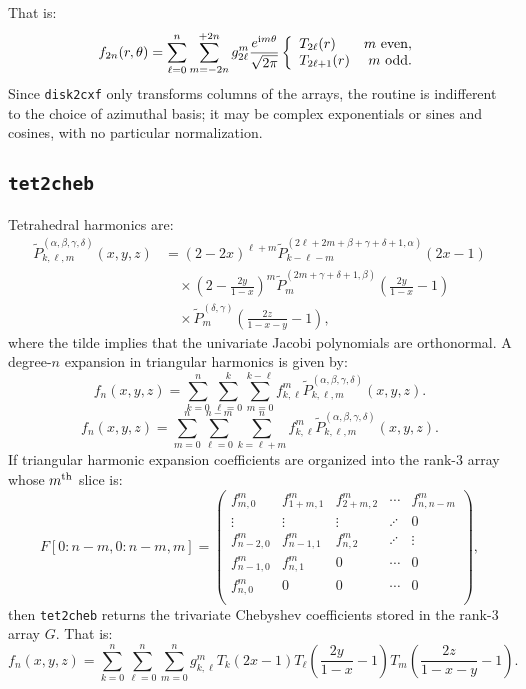 \documentclass{article}
\def\ii{{\rm i}}
\begin{document}
That is:
\begin{equation}
f_{2n}(r,\theta) = \sum_{\ell=0}^{n}\sum_{m=-2n}^{+2n} g_{2\ell}^m \frac{e^{\ii m\theta}}{\sqrt{2\pi}} \left\{\begin{array}{lr} T_{2\ell}(r) & m~{\rm even},\\ T_{2\ell+1}(r) & m~{\rm odd}.\end{array}\right.
\end{equation}
Since {\tt disk2cxf} only transforms columns of the arrays, the routine is indifferent to the choice of azimuthal basis; it may be complex exponentials or sines and cosines, with no particular normalization.

\subsection{{\tt tet2cheb}}

Tetrahedral harmonics are:
\begin{align}
\tilde{P}_{k,\ell,m}^{(\alpha,\beta,\gamma,\delta)}(x,y,z) & = (2-2x)^{\ell+m} \tilde{P}_{k-\ell-m}^{(2\ell+2m+\beta+\gamma+\delta+1,\alpha)}(2x-1)\nonumber\\
& \quad \times \left(2-\frac{2y}{1-x}\right)^m \tilde{P}_m^{(2m+\gamma+\delta+1,\beta)}\left(\frac{2y}{1-x}-1\right)\\
& \quad \times \tilde{P}_m^{(\delta,\gamma)}\left(\frac{2z}{1-x-y}-1\right),\nonumber
\end{align}
where the tilde implies that the univariate Jacobi polynomials are orthonormal. A degree-$n$ expansion in triangular harmonics is given by:
\begin{equation}
f_n(x,y,z) = \sum_{k=0}^n\sum_{\ell=0}^k\sum_{m=0}^{k-\ell} f_{k,\ell}^m \tilde{P}_{k,\ell,m}^{(\alpha,\beta,\gamma,\delta)}(x,y,z).
\end{equation}
\begin{equation}
f_n(x,y,z) = \sum_{m=0}^n\sum_{\ell=0}^{n-m}\sum_{k=\ell+m}^n f_{k,\ell}^m \tilde{P}_{k,\ell,m}^{(\alpha,\beta,\gamma,\delta)}(x,y,z).
\end{equation}
If triangular harmonic expansion coefficients are organized into the rank-$3$ array whose $m^{\rm th}$ slice is:
\begin{equation}
F[0:n-m,0:n-m,m] = \begin{pmatrix}
f_{m,0}^m & f_{1+m,1}^m & f_{2+m,2}^m & \cdots & f_{n,n-m}^m\\
\vdots & \vdots &  \vdots & \iddots & 0\\
f_{n-2,0}^m & f_{n-1,1}^m & f_{n,2}^m & \iddots & \vdots\\
f_{n-1,0}^m & f_{n,1}^m & 0 & \cdots & 0\\
f_{n,0}^m & 0 & 0 & \cdots & 0\\
\end{pmatrix},
\end{equation}
then {\tt tet2cheb} returns the trivariate Chebyshev coefficients stored in the rank-$3$ array $G$. That is:
\begin{equation}
f_n(x,y,z) = \sum_{k=0}^n\sum_{\ell=0}^n\sum_{m=0}^n g_{k,\ell}^m T_k(2x-1) T_\ell\left(\frac{2y}{1-x}-1\right) T_m\left(\frac{2z}{1-x-y}-1\right).
\end{equation}
\end{document}
